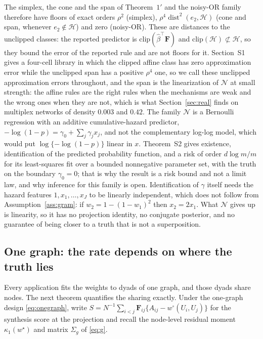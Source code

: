 \documentclass[12pt]{article}
\newcommand{\calH}{\mathcal{H}}
\newcommand{\calN}{\mathcal{N}}
\newcommand{\dist}{\operatorname{dist}}
\newcommand{\wstar}{w^{\star}}
\newcommand{\wproj}{w^{\circ}}
\newcommand{\bhat}{\hat\beta}
\newcommand{\Fv}{\mathbf{F}}
\begin{document}
The simplex, the cone and the span of Theorem~$1'$ and the noisy-OR family therefore have floors of exact orders $\rho^2$ (simplex), $\rho^4\dist^2(e_2,\calH)$ (cone and span, whenever $e_2\notin\calH$) and zero (noisy-OR). These are distances to the unclipped classes: the reported predictor is $\mathrm{clip}(\bhat^{\top}\Fv)$ and $\mathrm{clip}(\calH)\not\subset\calH$, so they bound the error of the reported rule and are not floors for it. Section~S1 gives a four-cell library in which the clipped affine class has zero approximation error while the unclipped span has a positive $\rho^4$ one, so we call these unclipped approximation errors throughout, and the span is the linearization of $\calN$ at small strength: the affine rules are the right rules when the mechanisms are weak and the wrong ones when they are not, which is what Section~\ref{sec:real} finds on multiplex networks of density $0.003$ and $0.42$. The family $\calN$ is a Bernoulli regression with an additive cumulative-hazard predictor, $-\log(1-p)=\gamma_0+\sum_j\gamma_jx_j$, and not the complementary log-log model, which would put $\log\{-\log(1-p)\}$ linear in $x$. Theorem~S2 gives existence, identification of the predicted probability function, and a risk of order $d\log m/m$ for its least-squares fit over a bounded nonnegative parameter set, with the truth on the boundary $\gamma_0=0$; that is why the result is a risk bound and not a limit law, and why inference for this family is open. Identification of $\gamma$ itself needs the hazard features $1,x_1,\dots,x_J$ to be linearly independent, which does not follow from Assumption~\ref{ass:gram}: if $w_2=1-(1-w_1)^2$ then $x_2=2x_1$. What $\calN$ gives up is linearity, so it has no projection identity, no conjugate posterior, and no guarantee of being closer to a truth that is not a superposition.

\subsection{One graph: the rate depends on where the truth lies}
\label{sec:onegraph}

Every application fits the weights to dyads of one graph, and those dyads share nodes. The next theorem quantifies the sharing exactly. Under the one-graph design \eqref{eq:onegraph}, write $S=N^{-1}\sum_{i<j}\Fv_{ij}\{A_{ij}-\wproj(U_i,U_j)\}$ for the synthesis score at the projection and recall the node-level residual moment $\kappa_1(\wstar)$ and matrix $\Sigma_g$ of \eqref{eq:g}.
\end{document}
